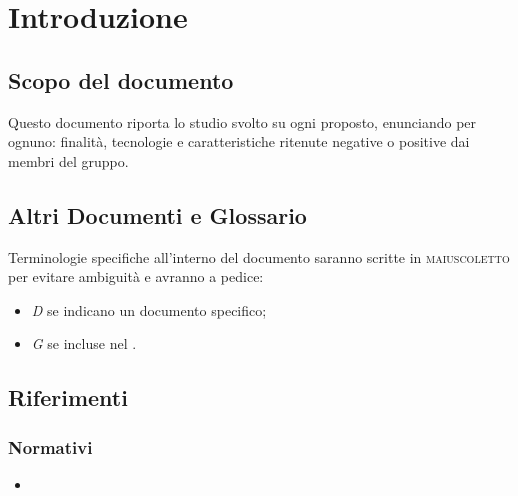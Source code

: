 \documentclass[]{article}
\begin{document}
	

	\newpage



	\section{Introduzione}
		\subsection{Scopo del documento}
		Questo documento riporta lo studio svolto su ogni  proposto,
		enunciando per ognuno: finalità, tecnologie e caratteristiche ritenute
		negative o positive dai membri del gruppo.

		\subsection{Altri Documenti e Glossario}
		Terminologie specifiche all'interno del documento saranno scritte in \textsc{maiuscoletto} per evitare ambiguità e avranno a pedice:
		\begin{itemize}
			\item \textit{D} se indicano un documento specifico;
			\item \textit{G} se incluse nel .
		\end{itemize}

		\subsection{Riferimenti}
			\subsubsection{Normativi}
			\begin{itemize}
				\item \textbf{}
			\end{itemize}
\end{document}
